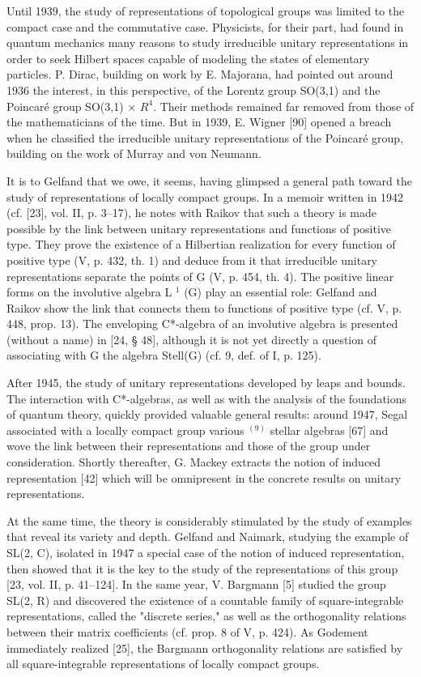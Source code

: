 
Until 1939, the study of representations of topological groups was limited to the compact case and the commutative case. Physicists, for their part, had found in quantum mechanics many reasons to study irreducible unitary representations in order to seek Hilbert spaces capable of modeling the states of elementary particles. P. Dirac, building on work by E. Majorana, had pointed out around 1936 the interest, in this perspective, of the Lorentz group SO(3,1) and the Poincaré group SO(3,1) × \(R^{4}\). Their methods remained far removed from those of the mathematicians of the time. But in 1939, E. Wigner {[}90{]} opened a breach when he classified the irreducible unitary representations of the Poincaré group, building on the work of Murray and von Neumann.

It is to Gelfand that we owe, it seems, having glimpsed a general path toward the study of representations of locally compact groups. In a memoir written in 1942 (cf. {[}23{]}, vol. II, p. 3--17), he notes with Raikov that such a theory is made possible by the link between unitary representations and functions of positive type. They prove the existence of a Hilbertian realization for every function of positive type (V, p. 432, th. 1) and deduce from it that irreducible unitary representations separate the points of G (V, p. 454, th. 4). The positive linear forms on the involutive algebra L \(^{1}\) (G) play an essential role: Gelfand and Raikov show the link that connects them to functions of positive type (cf. V, p. 448, prop. 13). The enveloping C*-algebra of an involutive algebra is presented (without a name) in {[}24, § 48{]}, although it is not yet directly a question of associating with G the algebra Stell(G) (cf. 9, def. of I, p. 125).

After 1945, the study of unitary representations developed by leaps and bounds. The interaction with C*-algebras, as well as with the analysis of the foundations of quantum theory, quickly provided valuable general results: around 1947, Segal associated with a locally compact group various \(^{(9)}\) stellar algebras {[}67{]} and wove the link between their representations and those of the group under consideration. Shortly thereafter, G. Mackey extracts the notion of induced representation {[}42{]} which will be omnipresent in the concrete results on unitary representations.

At the same time, the theory is considerably stimulated by the study of examples that reveal its variety and depth. Gelfand and Naimark, studying the example of SL(2, C), isolated in 1947 a special case of the notion of induced representation, then showed that it is the key to the study of the representations of this group {[}23, vol. II, p. 41--124{]}. In the same year, V. Bargmann {[}5{]} studied the group SL(2, R) and discovered the existence of a countable family of square-integrable representations, called the "discrete series," as well as the orthogonality relations between their matrix coefficients (cf. prop. 8 of V, p. 424). As Godement immediately realized {[}25{]}, the Bargmann orthogonality relations are satisfied by all square-integrable representations of locally compact groups.

